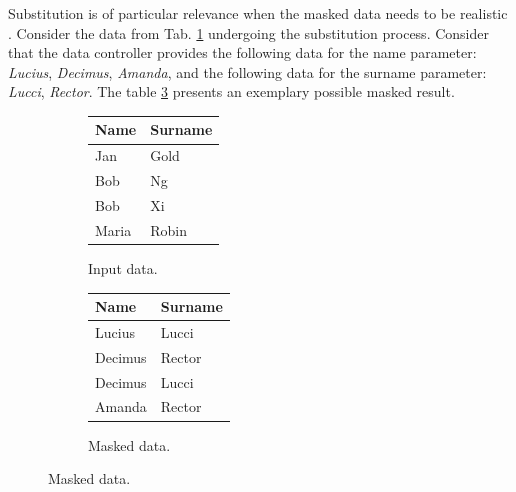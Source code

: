 \documentclass[a4paper,twoside,12pt]{book}
\begin{document}
Substitution is of particular relevance when the masked data needs to be realistic \cite{bib:anonymization_planning}.
%
Consider the data from Tab. \ref{id:tab:substitution_raw} undergoing the substitution process.
%
%
Consider that the data controller provides the following data for the name parameter: \textit{Lucius}, \textit{Decimus}, \textit {Amanda}, and the following data for the surname parameter: \textit{Lucci}, \textit{Rector}. The table \ref{id:tab:substitution_masked} presents an exemplary possible masked result.
%
%
%
\begin{figure}
\centering
\caption{Substitution.}
\begin{subfigure}{.4\textwidth}
\centering
\caption{Input data.}
\label{id:tab:substitution_raw}
\begin{tabular}{ll}
\toprule
Name   & Surname  \\ \midrule
Jan    & Gold     \\
Bob    & Ng       \\
Bob    & Xi       \\ 
Maria  & Robin    \\ \bottomrule
\end{tabular}
\end{subfigure}
\begin{subfigure}{.4\textwidth}
\centering
\caption{Masked data.}
\label{id:tab:substitution_masked}
\begin{tabular}{ll}
\toprule
Name    & Surname   \\ \midrule
Lucius  & Lucci     \\
Decimus & Rector    \\
Decimus & Lucci     \\ 
Amanda  & Rector    \\ \bottomrule
\end{tabular}
\end{subfigure}
\end{figure}
\end{document}
